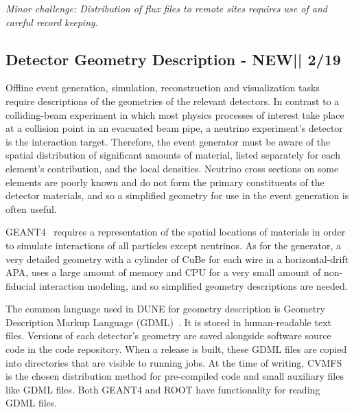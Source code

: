 \documentclass[../main-v1.tex]{subfiles}
\begin{document}
{\it Minor challenge:  Distribution of flux files to remote sites requires use of  and careful record keeping.}

\subsection{Detector Geometry Description - NEW|| 2/19}

Offline event generation, simulation, reconstruction and visualization tasks require descriptions of the geometries of the relevant detectors.  In contrast to a colliding-beam experiment in which most physics processes of interest take place at a collision point in an evacuated beam pipe, a neutrino experiment's detector is the interaction target.  Therefore, the event generator must be aware of the spatial distribution of significant amounts of material, listed separately for each element's contribution, and the local densities.  Neutrino cross sections on some elements are poorly known and do not form the primary constituents of the detector materials, and so a simplified geometry for use in the event generation is often useful.

GEANT4~\cite{geant4} requires a representation of the spatial locations of materials in order to simulate interactions of all particles except neutrinos.  As for the generator, a very detailed geometry with a cylinder of CuBe for each wire in a horizontal-drift APA, uses a large amount of memory and CPU for a very small amount of non-fiducial interaction modeling, and so simplified geometry descriptions are needed.

The common language used in DUNE for geometry description is Geometry Description Markup Language (GDML)~\cite{gdml}.  It is stored in human-readable text files.  Versions of each detector's geometry are saved alongside software source code in the code repository.  When a release is built, these GDML files are copied into directories that are visible to running jobs.  At the time of writing, CVMFS is the chosen distribution method for pre-compiled code and small auxiliary files like GDML files.   Both GEANT4 and ROOT have functionality for reading GDML files.
\end{document}
